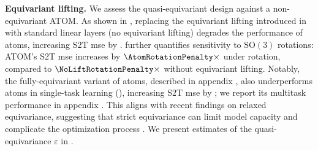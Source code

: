 \begin{figure}
    \centering
    \setlength{\extrarowheight}{1pt}   %
    \vspace{-10pt}
    \label{tab:equivariance_error}
\end{figure}

\textbf{Equivariant lifting.} We assess the quasi-equivariant design against a non-equivariant ATOM. As shown in , replacing the equivariant lifting introduced in  with standard linear layers (no equivariant lifting) degrades the performance of \gls{atoms}, increasing S2T \gls{mse} by \NoEquivariantLiftingvsDefault{}.  further quantifies sensitivity to \(\mathrm{SO}(3)\) rotations: ATOM's S2T \gls{mse} increases by \(\AtomRotationPenalty\times\) under rotation, compared to \(\NoLiftRotationPenalty\times\) without equivariant lifting. Notably, the fully-equivariant variant of \gls{atoms}, described in appendix , also underperforms \gls{atoms} in single-task learning (), increasing S2T \gls{mse} by \FullyEquivariantvsDefault{}; we report its multitask performance in appendix . This aligns with recent findings on relaxed equivariance, suggesting that strict equivariance can limit model capacity and complicate the optimization process \cite{elhag_relaxed_2025}. We present estimates of the quasi-equivariance \(\varepsilon\) in .

